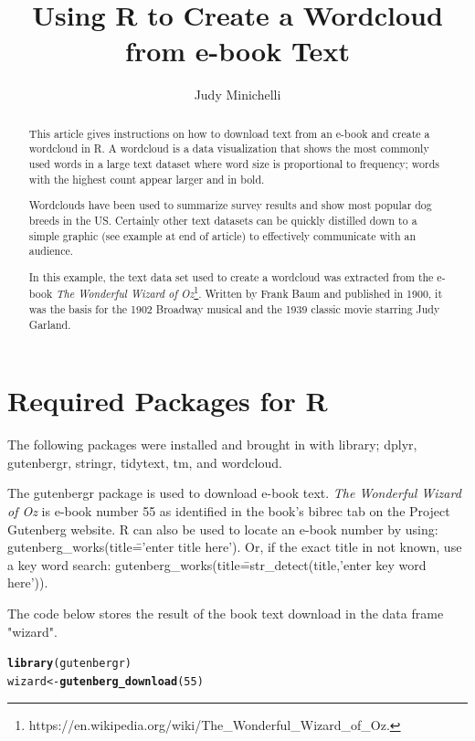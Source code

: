 \documentclass{article}\usepackage[]{graphicx}\usepackage[]{color}
\makeatletter
\newcommand{\hlnum}[1]{\textcolor[rgb]{0.686,0.059,0.569}{#1}}%
\newcommand{\hlstd}[1]{\textcolor[rgb]{0.345,0.345,0.345}{#1}}%
\newcommand{\hlkwb}[1]{\textcolor[rgb]{0.69,0.353,0.396}{#1}}%
\newcommand{\hlkwd}[1]{\textcolor[rgb]{0.737,0.353,0.396}{\textbf{#1}}}%
\newenvironment{kframe}{%
 \def\at@end@of@kframe{}%
 \ifinner\ifhmode%
  \def\at@end@of@kframe{\end{minipage}}%
  \begin{minipage}{\columnwidth}%
 \fi\fi%
 \def\FrameCommand##1{\hskip\@totalleftmargin \hskip-\fboxsep
 \colorbox{shadecolor}{##1}\hskip-\fboxsep
     \hskip-\linewidth \hskip-\@totalleftmargin \hskip\columnwidth}%
 \MakeFramed {\advance\hsize-\width
   \@totalleftmargin\z@ \linewidth\hsize
   \@setminipage}}%
 {\par\unskip\endMakeFramed%
 \at@end@of@kframe}
\newenvironment{knitrout}{}{} %
\makeatother
\begin{document}
\title{Using R to Create a Wordcloud from e-book Text}
\author{Judy Minichelli}
\maketitle

\begin{abstract}
This article gives instructions on how to download text from an e-book and create a 
wordcloud in R.  A wordcloud is a data visualization that shows the most commonly used words in a large text dataset where word size is proportional to frequency; words with the highest count appear larger and in bold.  

Wordclouds have been used to summarize survey results and show most popular dog breeds in the US.  Certainly other text datasets can be quickly distilled down to a simple graphic (see example at end of article) to effectively communicate with an audience.  

In this example, the text data set used to create a wordcloud was extracted from the e-book \textit{The Wonderful Wizard of Oz}\footnote{https://en.wikipedia.org/wiki/The_Wonderful_Wizard_of_Oz.}.  Written by Frank Baum and published in 1900, it was the basis for the 1902 Broadway musical and the 1939 classic movie starring Judy Garland.  

\end{abstract}

\section{Required Packages for R}

The following packages were installed and brought in with library; dplyr, gutenbergr, stringr, tidytext, tm, and wordcloud.

The gutenbergr package is used to download e-book text.  \textit{The Wonderful Wizard of Oz} is e-book number 55 as identified in the book's bibrec tab on the Project Gutenberg website. R can also be used to locate an e-book number by using:  gutenberg\_works(title\=='enter title here').  Or, if the exact title in not known, use a key word search:  gutenberg\_works(title\==str\_detect(title,'enter key word here')). 

The code below stores the result of the book text download in the data frame "wizard". 

\begin{knitrout}
\color{fgcolor}\begin{kframe}
\begin{alltt}
\hlkwd{library}\hlstd{(gutenbergr)}
\hlstd{wizard}\hlkwb{<-}\hlkwd{gutenberg_download}\hlstd{(}\hlnum{55}\hlstd{)}
\end{alltt}
\end{kframe}
\end{knitrout}
\end{document}
